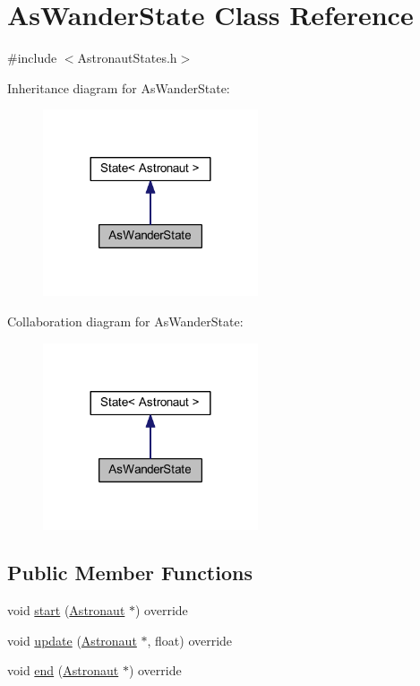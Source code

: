 \hypertarget{class_as_wander_state}{}\section{As\+Wander\+State Class Reference}
\label{class_as_wander_state}


{\ttfamily \#include $<$Astronaut\+States.\+h$>$}



Inheritance diagram for As\+Wander\+State\+:
\nopagebreak
\begin{figure}[H]
\begin{center}
\leavevmode
\includegraphics[width=180pt]{class_as_wander_state__inherit__graph}
\end{center}
\end{figure}


Collaboration diagram for As\+Wander\+State\+:
\nopagebreak
\begin{figure}[H]
\begin{center}
\leavevmode
\includegraphics[width=180pt]{class_as_wander_state__coll__graph}
\end{center}
\end{figure}
\subsection*{Public Member Functions}
\begin{DoxyCompactItemize}
\item 
void \hyperlink{class_as_wander_state_a7821ce2fdac9afa1b111f695ac51af43}{start} (\hyperlink{class_astronaut}{Astronaut} $\ast$) override
\item 
void \hyperlink{class_as_wander_state_ab95b3dd74d0f3109a4778fceda43221d}{update} (\hyperlink{class_astronaut}{Astronaut} $\ast$, float) override
\item 
void \hyperlink{class_as_wander_state_ab225e3074b252027cfd84f8fe9171e1c}{end} (\hyperlink{class_astronaut}{Astronaut} $\ast$) override
\end{DoxyCompactItemize}
